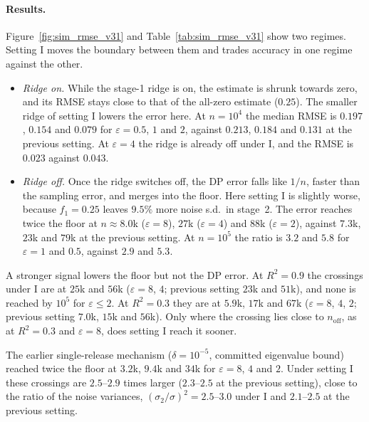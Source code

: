 \documentclass[11pt]{article}
\theoremstyle{definition}
\theoremstyle{plain}
\begin{document}
\paragraph{Results.} Figure~\ref{fig:sim_rmse_v31} and Table~\ref{tab:sim_rmse_v31} show two regimes. Setting I moves the boundary between them and trades accuracy in one regime against the other.
\begin{itemize}[noitemsep]
  \item \emph{Ridge on.} While the stage-1 ridge is on, the estimate is shrunk towards zero, and its RMSE stays close to that of the all-zero estimate ($0.25$). The smaller ridge of setting I lowers the error here. At $n = 10^{4}$ the median RMSE is $0.197$, $0.154$ and $0.079$ for $\varepsilon = 0.5$, $1$ and $2$, against $0.213$, $0.184$ and $0.131$ at the previous setting. At $\varepsilon = 4$ the ridge is already off under I, and the RMSE is $0.023$ against $0.043$.
  \item \emph{Ridge off.} Once the ridge switches off, the DP error falls like $1/n$, faster than the sampling error, and merges into the floor. Here setting I is slightly worse, because $f_1 = 0.25$ leaves $9.5\%$ more noise s.d.\ in stage~2. The error reaches twice the floor at $n \approx 8.0$k ($\varepsilon = 8$), $27$k ($\varepsilon = 4$) and $88$k ($\varepsilon = 2$), against $7.3$k, $23$k and $79$k at the previous setting. At $n = 10^{5}$ the ratio is $3.2$ and $5.8$ for $\varepsilon = 1$ and $0.5$, against $2.9$ and $5.3$.
\end{itemize}
A stronger signal lowers the floor but not the DP error. At $R^2 = 0.9$ the crossings under I are at $25$k and $56$k ($\varepsilon = 8$, $4$; previous setting $23$k and $51$k), and none is reached by $10^5$ for $\varepsilon \le 2$. At $R^2 = 0.3$ they are at $5.9$k, $17$k and $67$k ($\varepsilon = 8$, $4$, $2$; previous setting $7.0$k, $15$k and $56$k). Only where the crossing lies close to $n_{\mathrm{off}}$, as at $R^2 = 0.3$ and $\varepsilon = 8$, does setting I reach it sooner.

The earlier single-release mechanism ($\delta = 10^{-5}$, committed eigenvalue bound) reached twice the floor at $3.2$k, $9.4$k and $34$k for $\varepsilon = 8$, $4$ and $2$. Under setting I these crossings are $2.5$--$2.9$ times larger ($2.3$--$2.5$ at the previous setting), close to the ratio of the noise variances, $(\sigma_2/\sigma)^2 = 2.5$--$3.0$ under I and $2.1$--$2.5$ at the previous setting.
\end{document}
